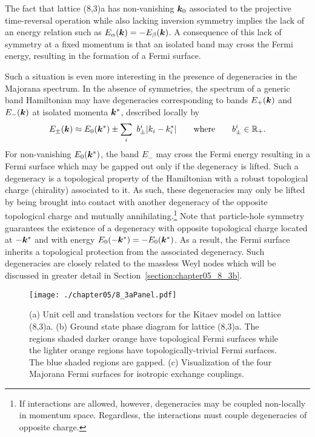 The fact that lattice (8,3)a has non-vanishing $\bm{k}_0$ associated to the projective time-reversal operation while also lacking inversion symmetry implies the lack of an energy relation such as $E_{\alpha}(\bm{k}) = -E_{\beta}(\bm{k})$.
A consequence of this lack of symmetry at a fixed momentum is that an isolated band may cross the Fermi energy, resulting in the formation of a Fermi surface.

Such a situation is even more interesting in the presence of degeneracies in the Majorana spectrum.
In the absence of symmetries, the spectrum of a generic band Hamiltonian may have degeneracies corresponding to bands $E_{+}(\bm{k})$ and $E_{-}(\bm{k})$ at isolated momenta $\bm{k}^*$, described locally by
%
\begin{equation}
	E_{\pm} (\bm{k}) \approx E_0(\bm{k}^*) \pm \sum_i~b^{i}_{\pm} |k_{i} - k^*_{i}| \qquad {\rm where } \qquad b^{i}_{\pm} \in \mathbb{R}_{+}.
\end{equation}
%
For non-vanishing $E_0(\bm{k}^*)$, the band $E_{-}$ may cross the Fermi energy resulting in a Fermi surface which may be gapped out only if the degeneracy is lifted.
Such a degeneracy is a topological property of the Hamiltonian with a robust topological charge (chirality) associated to it.
As such, these degeneracies may only be lifted by being brought into contact with another degeneracy of the opposite topological charge and mutually annihilating.\footnote{If interactions are allowed, however, degeneracies may be coupled non-locally in momentum space. Regardless, the interactions must couple degeneracies of opposite charge.}
Note that particle-hole symmetry guarantees the existence of a degeneracy with opposite topological charge located at $-\bm{k}^*$ and with energy $E_0(-\bm{k}^*) = -E_0(\bm{k}^*)$.
As a result, the Fermi surface inherits a topological protection from the associated degeneracy.
Such degeneracies are closely related to the massless Weyl nodes which will be discussed in greater detail in Section~\ref{section:chapter05_8_3b}.
%
\begin{figure}[tb]
	\centering
	\texttt{[image: ./chapter05/8\_3aPanel.pdf]}
	\caption{
		(a) Unit cell and translation vectors for the Kitaev model on lattice (8,3)a.
		(b) Ground state phase diagram for lattice (8,3)a.
		The regions shaded darker orange have topological Fermi surfaces while the lighter orange regions have topologically-trivial Fermi surfaces.
		The blue shaded regions are gapped.
		(c) Visualization of the four Majorana Fermi surfaces for isotropic exchange couplings.
	}
	\label{fig:chapter05_8_3aPanel}
\end{figure}
%

